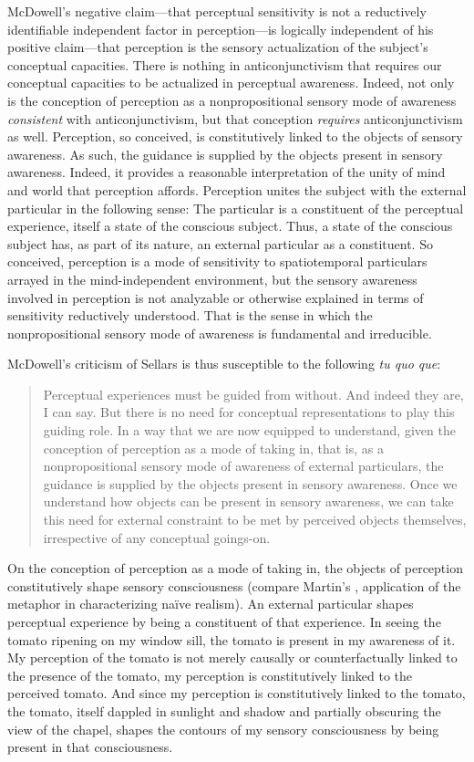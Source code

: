 \documentclass[12pt]{article}
\begin{document}
McDowell's negative claim---that perceptual sensitivity is not a reductively identifiable independent factor in perception---is logically independent of his positive claim---that perception is the sensory actualization of the subject's conceptual capacities. There is nothing in anticonjunctivism that requires our conceptual capacities to be actualized in perceptual awareness. Indeed, not only is the conception of perception as a nonpropositional sensory mode of awareness \emph{consistent} with anticonjunctivism, but that conception \emph{requires} anticonjunctivism as well. Perception, so conceived, is constitutively linked to the objects of sensory awareness. As such, the guidance is supplied by the objects present in sensory awareness. Indeed, it provides a reasonable interpretation of the unity of mind and world that perception affords. Perception unites the subject with the external particular in the following sense: The particular is a constituent of the perceptual experience, itself a state of the conscious subject. Thus, a state of the conscious subject has, as part of its nature, an external particular as a constituent. So conceived, perception is a mode of sensitivity to spatiotemporal particulars arrayed in the mind-independent environment, but the sensory awareness involved in perception is not analyzable or otherwise explained in terms of sensitivity reductively understood. That is the sense in which the nonpropositional sensory mode of awareness is fundamental and irreducible. 

McDowell's criticism of Sellars is thus susceptible to the following \emph{tu quo que}: 
\begin{quote}
    Perceptual experiences must be guided from without. And indeed they are, I can say. But there is no need for conceptual representations to play this guiding role. In a way that we are now equipped to understand, given the conception of perception as a mode of taking in, that is, as a nonpropositional sensory mode of awareness of external particulars, the guidance is supplied by the objects present in sensory awareness. Once we understand how objects can be present in sensory awareness, we can take this need for external constraint to be met by perceived objects themselves, irrespective of any conceptual goings-on.
\end{quote}

On the conception of perception as a mode of taking in, the objects of perception constitutively shape sensory consciousness (compare Martin's \citeyear[64]{Martin:2004fj}, application of the metaphor in characterizing naïve realism). An external particular shapes perceptual experience by being a constituent of that experience. In seeing the tomato ripening on my window sill, the tomato is present in my awareness of it. My perception of the tomato is not merely causally or counterfactually linked to the presence of the tomato, my perception is constitutively linked to the perceived tomato. And since my perception is constitutively linked to the tomato, the tomato, itself dappled in sunlight and shadow and partially obscuring the view of the chapel, shapes the contours of my sensory consciousness by being present in that consciousness.
\end{document}
